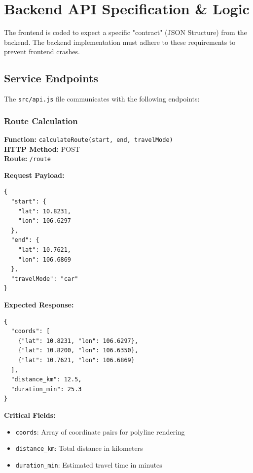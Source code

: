\chapter{Backend API Specification \& Logic}
\label{chap:backend}

The frontend is coded to expect a specific "contract" (JSON Structure) from the backend. The backend implementation must adhere to these requirements to prevent frontend crashes.

\section{Service Endpoints}

The \texttt{src/api.js} file communicates with the following endpoints:

\subsection{Route Calculation}

\textbf{Function:} \texttt{calculateRoute(start, end, travelMode)}\\
\textbf{HTTP Method:} POST\\
\textbf{Route:} \texttt{/route}

\textbf{Request Payload:}
\begin{tcolorbox}[colback=gray!10,colframe=black!50,arc=2mm]
\begin{verbatim}
{
  "start": {
    "lat": 10.8231,
    "lon": 106.6297
  },
  "end": {
    "lat": 10.7621,
    "lon": 106.6869
  },
  "travelMode": "car"
}
\end{verbatim}
\end{tcolorbox}

\textbf{Expected Response:}
\begin{tcolorbox}[colback=gray!10,colframe=black!50,arc=2mm]
\begin{verbatim}
{
  "coords": [
    {"lat": 10.8231, "lon": 106.6297},
    {"lat": 10.8200, "lon": 106.6350},
    {"lat": 10.7621, "lon": 106.6869}
  ],
  "distance_km": 12.5,
  "duration_min": 25.3
}
\end{verbatim}
\end{tcolorbox}

\textbf{Critical Fields:}
\begin{itemize}
    \item \texttt{coords}: Array of coordinate pairs for polyline rendering
    \item \texttt{distance\_km}: Total distance in kilometers
    \item \texttt{duration\_min}: Estimated travel time in minutes
\end{itemize}

